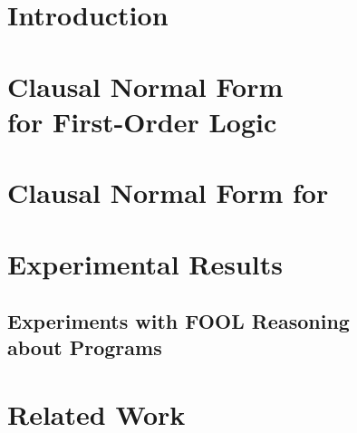 


\section{Introduction}
\label{sec:newcnf/introduction}


\section[Clausal Normal Form for First-Order Logic]{Clausal Normal Form\\for First-Order Logic}
\label{sec:newcnf/cnf}


\section{Clausal Normal Form for \folb}
\label{sec:newcnf/fool}


\section{Experimental Results}
\label{sec:newcnf/experiments}


\subsection[Experiments with FOOL Reasoning about Programs]{Experiments with FOOL Reasoning\\about Programs}
\label{subsec:PrgAn}


\section{Related Work}
\label{sec:related}


